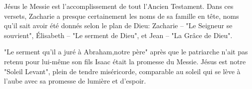Jésus le Messie est l'accomplissement de tout l'Ancien Testament. Dans ces versets, Zacharie a presque certainement les noms de sa famille en tête, noms qu'il sait avoir été donnés selon le plan de Dieu: Zacharie – "Le Seigneur se souvient", Élisabeth – "Le serment de Dieu", et Jean – "La Grâce de Dieu".

"Le serment qu’il a juré à Abraham,notre père" après que le patriarche n'ait pas retenu pour lui-même son fils Isaac était la promesse du Messie. Jésus est notre "Soleil Levant", plein de tendre miséricorde, comparable au soleil qui se lève à l'aube avec sa promesse de lumière et d'espoir.

\enlargethispage{5\baselineskip}

        
